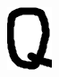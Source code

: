 \documentclass[russian,utf8,emptystyle]{eskdtext}
\begin{document}
\begin{figure}[!htb]
\includegraphics[width=\linewidth]{../data/learn/q/001}
\endminipage\hfill
{}

\end{figure}
\end{document}
